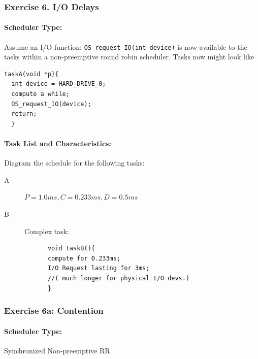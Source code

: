 
\subsubsection{Exercise 6. I/O Delays} 

\paragraph{Scheduler Type:} Assume an I/O function: {\tt OS\_request\_IO(int device)} is now available to the tasks within a non-preemptive round robin scheduler.   Tasks now might look like
\begin{verbatim}
taskA(void *p){
  int device = HARD_DRIVE_0;
  compute a while;
  OS_request_IO(device);
  return;
  }
\end{verbatim} 


\paragraph{Task List and Characteristics:}
 Diagram the schedule for the following tasks:
        \begin{description}
                \item[A] $P=1.0ms, C=0.233ms, D=0.5ms$
                \item[B] Complex task:
        \end{description}
\begin{verbatim}
            void taskB(){ 
            compute for 0.233ms;
            I/O Request lasting for 3ms;
            //( much longer for physical I/O devs.)
            }
\end{verbatim} 


 

\subsubsection*{Exercise 6a: Contention}

\paragraph{Scheduler Type:} Synchronized Non-preemptive RR.
